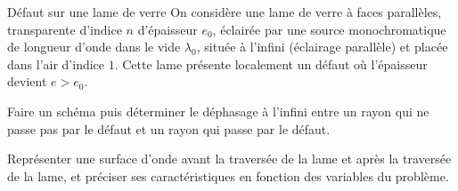 

\begin{exo}[PC]{Défaut sur une lame de verre}
On considère une lame de verre à faces parallèles, transparente d'indice $n$ d'épaisseur $e_0$, éclairée par une source monochromatique de longueur d'onde dans le vide $\lambda_0$, située à l'infini (éclairage parallèle) et placée dans l'air d'indice $1$. Cette lame présente localement un défaut où l'épaisseur devient $e>e_0$.
\begin{quest}
\item Faire un schéma puis déterminer le déphasage à l'infini entre un rayon qui ne passe pas par le défaut et un rayon qui passe par le défaut.
\item Représenter une surface d'onde avant la traversée de la lame et après la traversée de la lame, et préciser ses caractéristiques en fonction des variables du problème.
\end{quest}
\end{exo}


